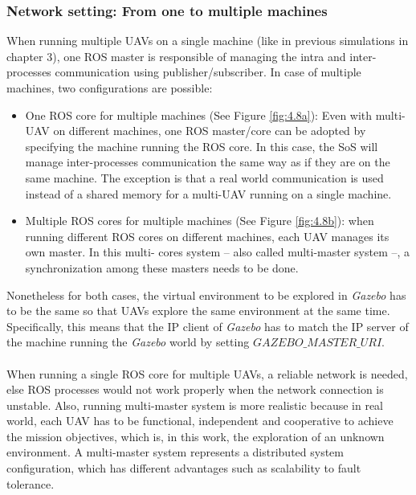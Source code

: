 \documentclass[11pt,openany]{book}
\begin{document}
\subsubsection{Network setting: From one to multiple machines}
When running multiple UAVs on a single machine (like in previous simulations in chapter 3), one ROS master is responsible of managing the intra and inter-processes communication using publisher/subscriber. In case of multiple machines, two conﬁgurations are possible:
\begin{itemize}
    \item One ROS core for multiple machines (See Figure \ref{fig:4.8a}): Even with multi-UAV on diﬀerent machines, one ROS master/core can be adopted by specifying the machine running the ROS core. In this case, the SoS will manage inter-processes communication the same way as if they are on the same machine. The exception is that a real world communication is used instead of a shared memory for a multi-UAV running on a single machine.
    \item Multiple ROS cores for multiple machines (See Figure \ref{fig:4.8b}): when running diﬀerent ROS cores on diﬀerent machines, each UAV manages its own master. In this multi- cores system – also called multi-master system –, a synchronization among these masters needs to be done.
\end{itemize}
Nonetheless for both cases, the virtual environment to be explored in \textit{Gazebo} has to be the same so that UAVs explore the same environment at the same time. Speciﬁcally, this means that the IP client of \textit{Gazebo} has to match the IP server of the machine running the \textit{Gazebo} world by setting $\textit{GAZEBO\_MASTER\_URI}$.\\\\
When running a single ROS core for multiple UAVs, a reliable network is needed, else ROS processes would not work properly when the network connection is unstable. Also, running multi-master system is more realistic because in real world, each UAV has to be functional, independent and cooperative to achieve the mission objectives, which is, in this work, the exploration of an unknown environment. A multi-master system represents a distributed system conﬁguration, which has diﬀerent advantages such as scalability to fault tolerance.
\end{document}

